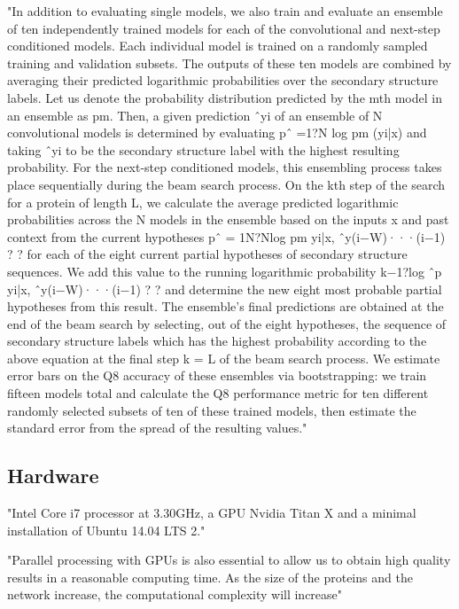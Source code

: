 \documentclass[]{scrartcl}
\begin{document}
"In addition to evaluating single models, we also train and evaluate an ensemble of ten independently trained models for each of the convolutional and next-step conditioned models. Each individual model is trained on a randomly sampled training and validation subsets. The outputs of these ten models are combined by averaging their predicted logarithmic probabilities over the secondary structure labels. Let us denote the probability distribution predicted by the mth model in an ensemble as pm. Then, a given prediction ˆyi of an ensemble of N convolutional models is determined by evaluating pˆ =1?N log pm (yi|x) and taking ˆyi to be the secondary structure label with the highest resulting probability. For the next-step conditioned models, this ensembling process takes place sequentially during the beam search process. On the kth step of the search for a protein of length L, we calculate the average predicted logarithmic probabilities across the N models in the ensemble based on the inputs x and past context from the current hypotheses pˆ = 1N?Nlog pm yi|x, ˆy(i−W)···(i−1) ? ? for each of the eight current partial hypotheses of secondary structure sequences. We add this value to the running logarithmic probability k−1?log ˆp yi|x, ˆy(i−W)···(i−1) ? ? and determine the new eight most probable partial hypotheses from this result. The ensemble’s final predictions are obtained at the end of the beam search by selecting, out of the eight hypotheses, the sequence of secondary structure labels which has the highest probability according to the above equation at the final step k = L of the beam search process. We estimate error bars on the Q8 accuracy of these ensembles via bootstrapping: we train fifteen models total and calculate the Q8 performance metric for ten different randomly selected subsets of ten of these trained models, then estimate the standard error from the spread of the resulting values." \cite{Busia2017}

\subsection{Hardware}
"Intel Core i7 processor at 3.30GHz, a GPU Nvidia Titan X and a minimal installation of Ubuntu 14.04 LTS 2." \cite{Hattori2017}

"Parallel processing with GPUs is also essential to allow us to obtain high quality results in a reasonable computing time. As the size of the proteins and the network increase, the computational complexity will increase" \cite{Hattori2017}
\end{document}
